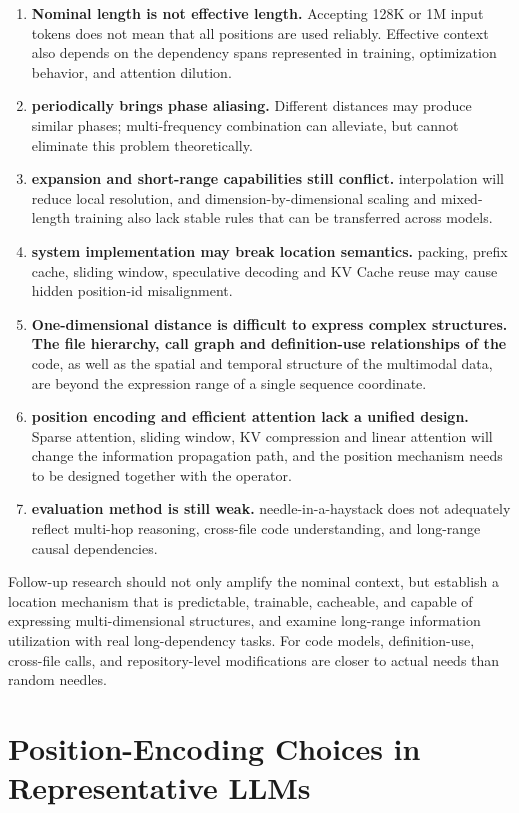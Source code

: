 \documentclass[UTF8,fontset=none,a4paper,10pt]{ctexart}
\def\BilingualAnchorPrefix{en}
\let\BilingualOriginalAppendix\appendix
\renewcommand{\appendix}{%
  \BilingualOriginalAppendix
  \renewcommand*{\theHsection}{\BilingualAnchorPrefix.appendix.\Alph{section}}%
}
\begin{document}
\begin{enumerate}
\item \textbf{Nominal length is not effective length.} Accepting 128K or 1M input tokens does not mean that all positions are used reliably. Effective context also depends on the dependency spans represented in training, optimization behavior, and attention dilution.
\item \textbf{ periodically brings phase aliasing. } Different distances may produce similar phases; multi-frequency combination can alleviate, but cannot eliminate this problem theoretically.
\item \textbf{ expansion and short-range capabilities still conflict. } interpolation will reduce local resolution, and dimension-by-dimensional scaling and mixed-length training also lack stable rules that can be transferred across models.
\item \textbf{ system implementation may break location semantics. }packing, prefix cache, sliding window, speculative decoding and KV Cache reuse may cause hidden position-id misalignment.
\item \textbf{ One-dimensional distance is difficult to express complex structures. The file hierarchy, call graph and definition-use relationships of the } code, as well as the spatial and temporal structure of the multimodal data, are beyond the expression range of a single sequence coordinate.
\item \textbf{ position encoding and efficient attention lack a unified design. } Sparse attention, sliding window, KV compression and linear attention will change the information propagation path, and the position mechanism needs to be designed together with the operator.
\item \textbf{ evaluation method is still weak. }needle-in-a-haystack does not adequately reflect multi-hop reasoning, cross-file code understanding, and long-range causal dependencies.
\end{enumerate}

Follow-up research should not only amplify the nominal context, but establish a location mechanism that is predictable, trainable, cacheable, and capable of expressing multi-dimensional structures, and examine long-range information utilization with real long-dependency tasks. For code models, definition-use, cross-file calls, and repository-level modifications are closer to actual needs than random needles.

\clearpage
\appendix
\section{Position-Encoding Choices in Representative LLMs}
\end{document}
